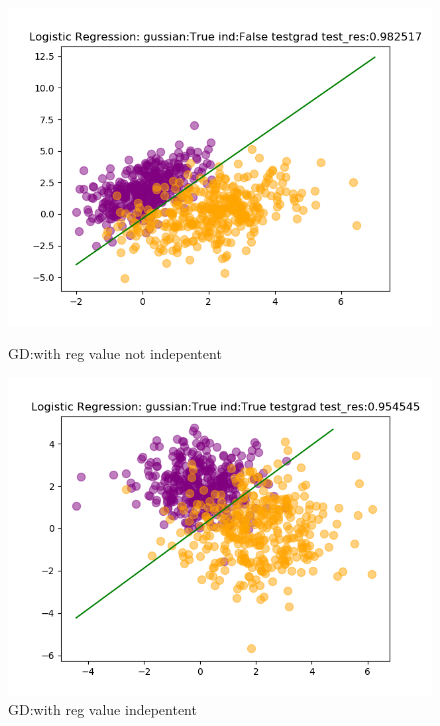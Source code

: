 \documentclass{article}
\begin{document}
\begin{figure}[h]
    \\
    \begin{minipage}[t]{0.4\linewidth}
    \centering
    \includegraphics[width=1.2\textwidth]{pic/LogisticRegression_gussian=Trueind=Falsetestgrad.png}
    \caption{GD:with reg value not indepentent}
    \label{fig:GD:with reg value not indepentent}
    \end{minipage}
    \hfill
    \begin{minipage}[t]{0.4\linewidth}
    \centering
    \includegraphics[width=1.2\textwidth]{pic/LogisticRegression_gussian=Trueind=Truetestgrad.png}
    \caption{GD:with reg value indepentent}
    \label{fig:GD:with reg value indepentent}
    \end{minipage}
\end{figure}
\end{document}
